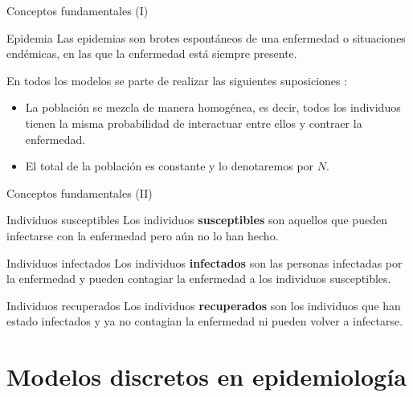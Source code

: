 \begin{frame}{Conceptos fundamentales (I)}

    \begin{block}{Epidemia}
        Las epidemias son brotes espontáneos de una enfermedad o situaciones endémicas, en las que la enfermedad está siempre presente.
    \end{block}  

    \pause

    En todos los modelos se parte de realizar las siguientes suposiciones \cite{allenDiscretetimeSISIR1994}:

    \begin{itemize}
        \item La población se mezcla de manera homogénea, es decir, todos los individuos tienen la misma probabilidad de interactuar entre ellos y contraer la enfermedad.
        \item El total de la población es constante y lo denotaremos por $N$.
    \end{itemize}

\end{frame}


\begin{frame}{Conceptos fundamentales (II)}

    \begin{block}{Individuos susceptibles}
        Los individuos \textbf{susceptibles} son aquellos que pueden infectarse con la enfermedad pero aún no lo han hecho.
    \end{block}  

    \pause

    \begin{block}{Individuos infectados}
        Los individuos \textbf{infectados} son las personas infectadas por la enfermedad y pueden contagiar la enfermedad a los individuos susceptibles.
    \end{block}  

    \pause

    \begin{block}{Individuos recuperados}
        Los individuos \textbf{recuperados} son los individuos que han estado infectados y ya no contagian la enfermedad ni pueden volver a infectarse.
    \end{block}  


\end{frame}




\section{Modelos discretos en epidemiología}


